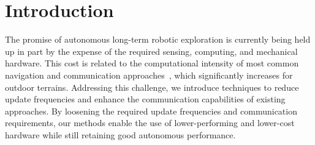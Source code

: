 \documentclass[letterpaper,10pt,conference,twoside]{IEEEtran}
\theoremstyle{definition}
\begin{document}
\section{Introduction}
\noindent
The promise of autonomous long-term robotic exploration is currently being held up in part by the expense of the required sensing, computing, and mechanical hardware. %
This cost is related to the computational intensity of most common navigation and communication approaches~\cite{lluvia2021active,placed2022survey}, which significantly increases for %
outdoor terrains. Addressing this challenge, we introduce %
techniques to reduce update frequencies and enhance the communication capabilities of existing approaches. By loosening the required update frequencies and communication requirements, our methods enable the use of lower-performing and lower-cost hardware while still retaining good autonomous performance.
\end{document}
